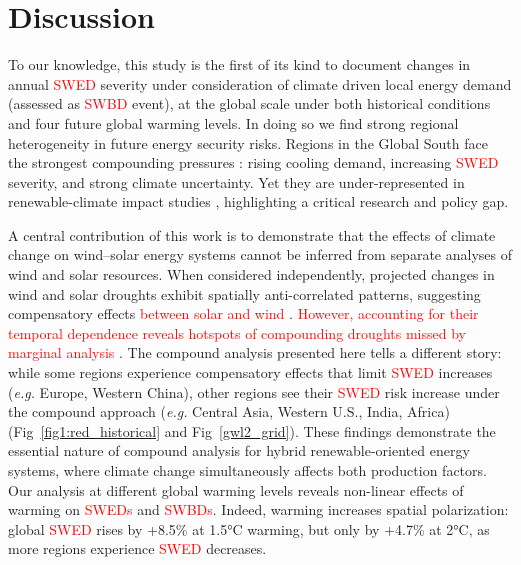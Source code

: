 \documentclass[pdflatex,sn-mathphys-num]{sn-jnl}%
\begin{document}
\section{Discussion}\label{sec:discussion}

To our knowledge, this study is the first of its kind to document changes in annual \textcolor{red}{SWED} severity under consideration of climate driven local energy demand (assessed as \textcolor{red}{SWBD} event), at the global scale under both historical conditions and four future global warming levels. In doing so we find strong regional heterogeneity in future energy security risks. Regions in the Global South face the strongest compounding pressures : rising cooling demand, increasing \textcolor{red}{SWED} severity, and strong climate uncertainty. Yet they are under-represented in renewable-climate impact studies \cite{gangopadhyayRoleWindsolarHybrid2022, juraszComplementarityResourceDroughts2021}, highlighting a critical research and policy gap.

A central contribution of this work is to demonstrate that the effects of climate change on wind–solar energy systems cannot be inferred from separate analyses of wind and solar resources. When considered independently, projected changes in wind and solar droughts exhibit spatially anti-correlated patterns, suggesting compensatory effects \textcolor{red}{between solar and wind} \cite{wangRisingWorldwideChallenges2025, liuClimateChangeImpacts2023, duttaFutureSolarEnergy2022, quProlongedWindDroughts2025a}. \textcolor{red}{However, accounting for their temporal dependence reveals hotspots of compounding droughts missed by marginal analysis} \cite{Zscheischler2020}. The compound analysis presented here tells a different story: while some regions experience compensatory effects that limit \textcolor{red}{SWED} increases (\textit{e.g.} Europe, Western China), other regions see their \textcolor{red}{SWED} risk increase under the compound approach (\textit{e.g.} Central Asia, Western U.S., India, Africa) (Fig~\ref{fig1:red_historical} and Fig~\ref{gwl2_grid}). These findings demonstrate the essential nature of compound analysis for hybrid renewable-oriented energy systems, where climate change simultaneously affects both production factors. Our analysis at different global warming levels reveals non-linear effects of warming on \textcolor{red}{SWEDs} and \textcolor{red}{SWBDs}. Indeed, warming increases spatial polarization: global \textcolor{red}{SWED} rises by +8.5\% at 1.5°C warming, but only by +4.7\% at 2°C, as more regions experience \textcolor{red}{SWED} decreases.
\end{document}
